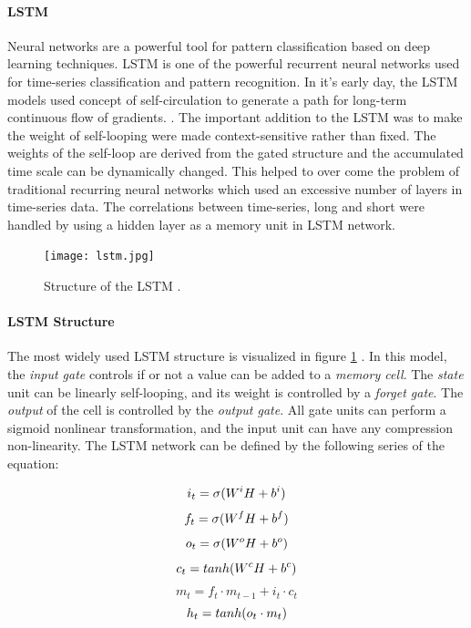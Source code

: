 \paragraph{LSTM} Neural networks are a powerful tool for pattern classification based on deep learning techniques. LSTM is one of the powerful recurrent neural networks used for time-series classification and pattern recognition. In it's early day, the LSTM models used concept of self-circulation
to generate a path for long-term continuous flow of gradients. \cite{long_short_hochreiter}.  The important addition to the LSTM was to make the weight of self-looping were made context-sensitive rather than fixed. The weights of the self-loop are derived from the gated structure and the accumulated time scale can be dynamically changed. This helped to over come the problem of traditional recurring neural networks which used an excessive number of layers in time-series data. The correlations between time-series, long and short were handled by using a hidden layer as a memory unit in LSTM network. 

\begin{figure}
    \centering
    \texttt{[image: lstm.jpg]}
    \caption{Structure of the LSTM \cite{liu_td-lstm:_2018}.}
    \label{fig:lstm_structure}
\end{figure}
\paragraph{LSTM Structure} The most widely used LSTM structure is visualized in figure \ref{fig:lstm_structure} \cite{liu_td-lstm:_2018}. In this model, the  \textit{input gate} controls if or not a value can be added to a \textit{memory cell}. The \textit{state} unit can be linearly self-looping, and its weight is controlled by a \textit{forget gate}. The \textit{output} of the cell is controlled by the \textit{output gate}. All gate units can perform a sigmoid nonlinear transformation, and the input unit can have any compression non-linearity. The LSTM network can be defined by the following series of the equation:

\begin{equation}
\label{eq:lstm_threshold}
    i_{t} = \sigma \small(W^iH + b^i)
\end{equation}
\begin{equation}
\label{eq:lstm_forget_gate}
    f_{t} = \sigma \small(W^fH + b^f)
\end{equation}
\begin{equation}
\label{eq:lstm_output_gate}
    o_{t} = \sigma \small(W^oH + b^o)
\end{equation}
\begin{equation}
\label{eq:lstm_new_state}
    c_{t} = tanh \small(W^cH + b^c)
\end{equation}
\begin{equation}
\label{eq:lstm_output}
    m_{t} = f_{t}\cdot m_{t-1} + i_{t}\cdot c_{t}
\end{equation}
\begin{equation}
\label{eq:lstm_6}
    h_{t} = tanh\small(o_{t}\cdot m_{t})
\end{equation}

